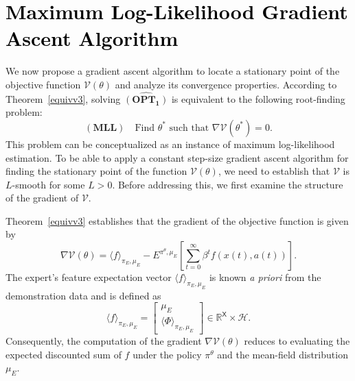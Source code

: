 \documentclass[11pt]{article}
\newcommand{\R}{\mathbb{R}}
\newcommand{\sX}{{\mathsf X}}
\newcommand{\cH}{{\mathcal H}}
\newcommand{\V}{{\mathcal V}}
\newcommand{\lk}[1]{\textcolor{black}{#1}} %
\begin{document}
\section{\lk{Maximum Log-Likelihood Gradient Ascent Algorithm}}

We now propose a gradient ascent algorithm to locate a stationary point of the objective function $\mathcal{V}(\theta)$ and analyze its convergence properties. According to Theorem~\ref{equivv3}, solving $\mathbf{\widehat{(OPT_1)}}$ is equivalent to the following root-finding problem:
\[
\mathbf{(MLL)} \quad \text{Find } \theta^* \text{ such that } \nabla \mathcal{V}(\theta^*) = 0.
\]
This problem can be conceptualized as an instance of maximum log-likelihood estimation. To be able to apply a constant step-size gradient ascent algorithm for finding the stationary point of the function $\V(\theta)$, we need to establish that $\V$ is $L$-smooth for some $L>0$. Before addressing this, we first examine the structure of the gradient of $\V$.

Theorem~\ref{equivv3} establishes that the gradient of the objective function is given by
$$
\nabla \V(\theta) = \langle f \rangle_{\pi_E,\mu_E} - E^{\pi^{\theta},\mu_E} \left[ \sum_{t=0}^{\infty} \beta^t f(x(t),a(t)) \right].
$$
The expert's feature expectation vector $\langle f \rangle_{\pi_E,\mu_E}$ is known \textit{a priori} from the demonstration data and is defined as
$$
\langle f \rangle_{\pi_E,\mu_E} = \begin{bmatrix}
\mu_E \\ \langle \Phi \rangle_{\pi_E,\mu_E}
\end{bmatrix} \in \R^{\sX} \times \cH.
$$
Consequently, the computation of the gradient \( \nabla \V(\theta) \) reduces to evaluating the expected discounted sum of $f$ under the policy \( \pi^{\theta} \) and the mean-field distribution \( \mu_E \). 
\end{document}
